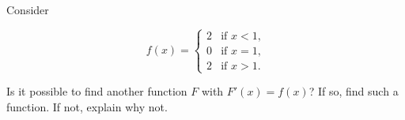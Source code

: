 \documentclass{ximera}
\author{Steven Gubkin}
\begin{document}
\begin{exercise}


Consider

\[
f(x) = \begin{cases}
	2 &\text{if $x<1$,}\\
	0 &\text{if $x =1$,}\\
	2 &\text{if $x>1$.}
\end{cases}
\]

Is it possible to find another function $F$ with $F'(x) = f(x)$?  If so, find such a function.  If not, explain why not.

\end{exercise}
\end{document}
